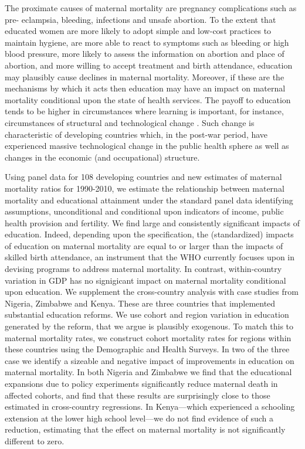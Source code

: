 \documentclass{article}[12pt,subeqn]
\begin{document}
\begin{spacing}{1.4}
The proximate causes of maternal mortality are pregnancy complications such as pre-
eclampsia, bleeding, infections and unsafe abortion. To the extent that educated women are more likely 
to adopt simple and low-cost practices to maintain hygiene, are more able to react to symptoms such as bleeding 
or high blood
pressure, more likely to assess the information on abortion and place of abortion, and more willing to accept
treatment and birth attendance, education may plausibly cause declines in maternal mortality. Moreover, if
these are the mechanisms by which it acts then education may have an impact on maternal mortality
conditional upon the state of health services. The payoff to education tends to be higher in circumstances
where learning is important, for instance, circumstances of structural and technological change 
\citep{FosterRosenzweig2004}. Such change is characteristic of developing countries which, in the post-war period,
have experienced massive technological change in the public health sphere \citep{Cutleretal2006} as
well as changes in the economic (and occupational) structure.

Using panel data for 108 developing countries and new estimates of maternal mortality ratios for 1990-2010,
we estimate the relationship between maternal mortality and educational attainment under the standard
panel data identifying assumptions, unconditional and conditional upon indicators of income, public health
provision and fertility. We find large and consistently significant impacts of education. Indeed, depending
upon the specification, the (standardized) impacts of education on maternal mortality are equal to or larger
than the impacts of skilled birth attendance, an instrument that the WHO currently focuses upon in devising
programs to address maternal mortality. In contrast, within-country variation in GDP has no signigicant
impact on maternal mortality conditional upon education. We supplement the cross-country analysis with
case studies from Nigeria, Zimbabwe and Kenya. These are three countries that implemented substantial
education reforms. We use cohort and region variation in education generated by the reform, that we argue
is plausibly exogenous. To match this to maternal mortality rates, we construct cohort mortality rates for
regions within these countries using the Demographic and Health Surveys. In two of the three case we identify a
sizeable and negative impact of improvements in education on maternal mortality. In both Nigeria and Zimbabwe
we find that the educational expansions due to policy experiments significantly reduce maternal death in
affected cohorts, and find that these results are surprisingly close to those estimated in cross-country 
regressions.  In Kenya---which experienced a schooling extension at the lower high school level---we do not 
find evidence of such a reduction, estimating that the effect on maternal mortality is not significantly
different to zero.


\end{spacing}
\end{document}
